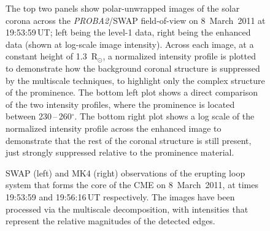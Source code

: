 \documentclass[namedreferences]{solarphysics}
\begin{document}
\begin{article}
\begin{figure}[t]
\caption{The top two panels show polar-unwrapped images of the solar corona across the \emph{PROBA2}/SWAP field-of-view on 8~March~2011 at 19:53:59\,UT; left being the level-1 data, right being the enhanced data (shown at log-scale image intensity). Across each image, at a constant height of 1.3~R$_\odot$, a normalized intensity profile is plotted to demonstrate how the background coronal structure is suppressed by the multiscale techniques, to highlight only the complex structure of the prominence. The bottom left plot shows a direct comparison of the two intensity profiles, where the prominence is located between 230\,--\,260$^\circ$. The bottom right plot shows a log scale of the normalized intensity profile across the enhanced image to demonstrate that the rest of the coronal structure is still present, just strongly suppressed relative to the prominence material.}
\label{polar_fig_swap_20110308}
\end{figure}

\begin{figure}[t]
\caption{SWAP (left) and MK4 (right) observations of the erupting loop system that forms the core of the CME on 8~March~2011, at times 19:53:59 and 19:56:16\,UT respectively. The images have been processed via the multiscale decomposition, with intensities that represent the relative magnitudes of the detected edges.}
\label{combined_modgrad_points}
\end{figure}



\end{article}
\end{document}

